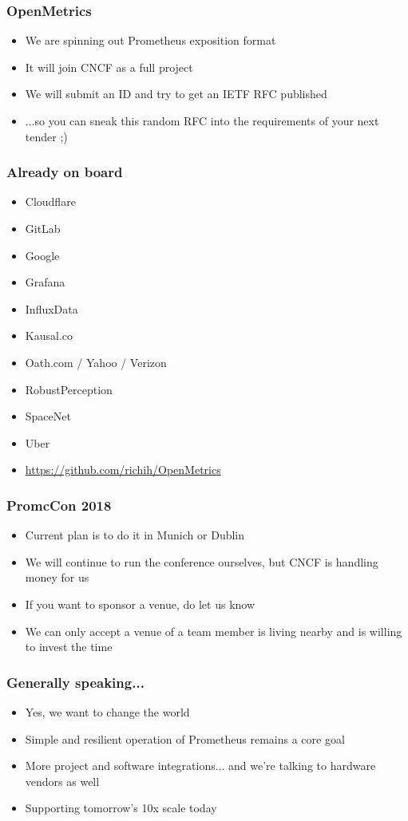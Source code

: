 \documentclass[t]{beamer}
\begin{document}
\begin{frame}
	\frametitle{OpenMetrics}
	\begin{itemize}
		\item We are spinning out Prometheus exposition format
		\item It will join CNCF as a full project
		\item We will submit an ID and try to get an IETF RFC published
		\item ...so you can sneak this random RFC into the requirements of your next tender ;)
	\end{itemize}
\end{frame}

\begin{frame}
	\frametitle{Already on board}
	\begin{itemize}
		\item Cloudflare
		\item GitLab
		\item Google
		\item Grafana
		\item InfluxData
		\item Kausal.co
		\item Oath.com / Yahoo / Verizon
		\item RobustPerception
		\item SpaceNet
		\item Uber
		\item \url{https://github.com/richih/OpenMetrics}
	\end{itemize}
\end{frame}

\begin{frame}
	\frametitle{PromcCon 2018}
	\begin{itemize}
		\item Current plan is to do it in Munich or Dublin
		\item We will continue to run the conference ourselves, but CNCF is handling money for us
		\item If you want to sponsor a venue, do let us know
		\item We can only accept a venue of a team member is living nearby and is willing to invest the time
	\end{itemize}
\end{frame}

\begin{frame}
	\frametitle{Generally speaking...}
	\begin{itemize}
		\item Yes, we want to change the world
		\item Simple and resilient operation of Prometheus remains a core goal
		\item More project and software integrations... and we're talking to hardware vendors as well
		\item Supporting tomorrow's 10x scale today
	\end{itemize}
\end{frame}
\end{document}
